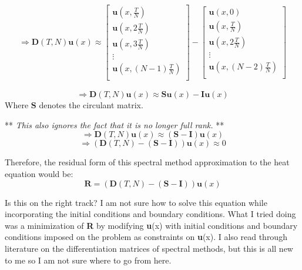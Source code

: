 \documentclass{article}
\begin{document}
\begin{align*}
\Rightarrow \textbf{D}(T,N)\textbf{u}(x)
    \approx \begin{bmatrix}
       \textbf{u}(x,\frac{T}{N}) \\
       \textbf{u}(x,2\frac{T}{N}) \\
       \textbf{u}(x,3\frac{T}{N}) \\
       \vdots \\
       \textbf{u}(x,(N-1)\frac{T}{N}) \\
   \end{bmatrix}
   - \begin{bmatrix}
       \textbf{u}(x,0) \\
       \textbf{u}(x,\frac{T}{N}) \\
       \textbf{u}(x,2\frac{T}{N}) \\
       \vdots \\
       \textbf{u}(x,(N-2)\frac{T}{N}) \\
   \end{bmatrix}
   \end{align*}

$$\Rightarrow \textbf{D}(T,N)\textbf{u}(x) \approx \textbf{S}\textbf{u}(x) - \textbf{I}\textbf{u}(x)$$  
Where $\textbf{S}$ denotes the circulant matrix. 

** \textit{This also ignores the fact that it is no longer full rank.} **
$$\Rightarrow \textbf{D}(T,N)\textbf{u}(x) \approx (\textbf{S}-\textbf{I})\textbf{u}(x)$$  
$$\Rightarrow (\textbf{D}(T,N) - (\textbf{S}-\textbf{I}))\textbf{u}(x) \approx 0$$  

Therefore, the residual form of this spectral method approximation to the heat equation would be:
$$\textbf{R} = (\textbf{D}(T,N) - (\textbf{S}-\textbf{I}))\textbf{u}(x)$$

Is this on the right track? I am not sure how to solve this equation while incorporating the initial conditions and boundary conditions. 
What I tried doing was a minimization of \textbf{R} by modifying \textbf{u}(x) with initial conditions and boundary conditions imposed on the problem as constraints on \textbf{u}(x).
I also read through literature on the differentiation matrices of spectral methods, but this is all new to me so I am not sure where to go from here. 
\end{document}
